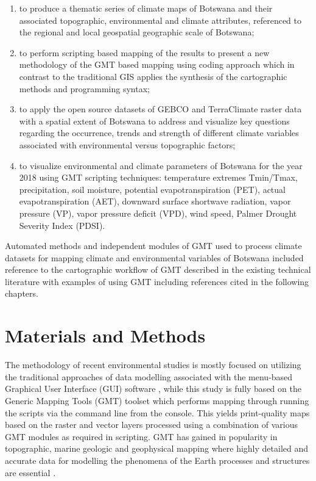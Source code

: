 \documentclass[ijgi,article,submit,pdftex,moreauthors]{Definitions/mdpi}
\begin{document}
\begin{enumerate}[label=\roman*]
	\item	to produce a thematic series of climate maps of Botswana and their associated topographic, environmental and climate attributes, referenced to the regional and local geospatial geographic scale of Botswana; 
	\item to perform scripting based mapping of the results to present a new methodology of the GMT based mapping using coding approach which in contrast to the traditional GIS applies the synthesis of the cartographic methods and programming syntax;
	\item to apply the open source datasets of GEBCO and TerraClimate raster data with a spatial extent of Botswana to address and visualize key questions regarding the occurrence, trends and strength of different climate variables associated with environmental versus topographic factors;
	\item to visualize environmental and climate parameters of Botswana for the year 2018 using GMT scripting techniques: temperature extremes Tmin/Tmax, precipitation, soil moisture, potential evapotranspiration (PET), actual evapotranspiration (AET), downward surface shortwave radiation, vapor pressure (VP), vapor pressure deficit (VPD), wind speed, Palmer Drought Severity Index (PDSI).
\end{enumerate}
    
Automated methods and independent modules of GMT used to process climate datasets for mapping climate and environmental variables of Botswana included reference to the cartographic workflow of GMT described in the existing technical literature with examples of using GMT \cite{Kasalica,Lemenkova2019106,Lemenkova202205,Lemenkova201994} including references cited in the following chapters. 

\section{Materials and Methods}

The methodology of recent environmental studies is mostly focused on utilizing the traditional approaches of data modelling associated with the menu-based Graphical User Interface (GUI) software \cite{Kolawole,Lemenkova202206,Ringrose1996,Lindh2021a,Manisa,Lemenkova202141,Ringrose1999,Lemenkova202125,Pachka,Pricope,Lemenkova202021}, while this study is fully based on the Generic Mapping Tools (GMT) toolset \cite{Wessel} which performs mapping through running the scripts via the command line from the console. This yields print-quality maps based on the raster and vector layers processed using a combination of various GMT modules as required in scripting. GMT has gained in popularity in topographic, marine geologic and geophysical mapping where highly detailed and accurate data for modelling the phenomena of the Earth processes and structures are essential \cite{Virden,Lemenkova202127,Senturk,Lemenkova202017,Lindh202208,Lemenkova202018,Shietal2009}.  
\end{document}
